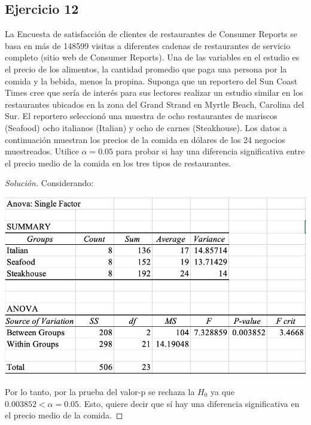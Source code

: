 \documentclass[a4paper,12pt]{article}
\newenvironment{solution}
  {\renewcommand\qedsymbol{$\blacksquare$}\begin{proof}[Solución]}
  {\end{proof}}
\begin{document}
\subsection{Ejercicio 12}
La Encuesta de satisfacción de clientes de restaurantes de Consumer Reports se basa en más de 148599 visitas a diferentes cadenas de restaurantes de servicio completo (sitio web de Consumer Reports). Una de las variables en el estudio es el precio de los alimentos, la cantidad promedio que paga una persona por la comida y la bebida, menos la propina. Suponga que un reportero del Sun Coast Times cree que sería de interés para sus lectores realizar un estudio similar en los restaurantes ubicados en la zona del Grand Strand en Myrtle Beach, Carolina del Sur. El reportero seleccionó una muestra de ocho restaurantes de mariscos (Seafood) ocho italianos (Italian) y ocho de carnes (Steakhouse). Los datos a continuación muestran los precios de la comida en dólares de los 24 negocios muestreados. Utilice $\alpha= 0.05$ para probar si hay una diferencia significativa entre el precio medio de la comida en los tres tipos de restaurantes.
\begin{solution}
Considerando: 
\begin{center}
    \includegraphics[scale=0.5]{Imagenes/12.png}
\end{center}
Por lo tanto, por la prueba del valor-p se rechaza la $H_0$ ya que $0.003852<\alpha=0.05$. Esto, quiere decir que sí hay una diferencia significativa en el precio medio de la comida.
\end{solution}
\end{document}

